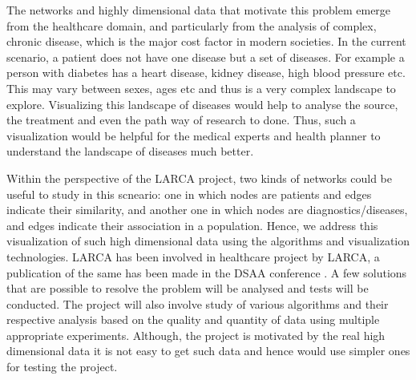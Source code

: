 \par The networks and highly dimensional data that motivate this problem emerge from the healthcare domain, and particularly from the analysis of complex, chronic disease, which is the major cost factor in modern societies. In the current scenario, a patient does not have one disease but a
set of diseases. For example a person with diabetes has a heart disease, kidney disease, high blood
pressure etc. This may vary between sexes, ages etc and thus is a very complex landscape to
explore. Visualizing this landscape of diseases would help to analyse the source, the treatment
and even the path way of research to done. Thus, such a visualization would be helpful for the
medical experts and health planner to understand the landscape of diseases much better.
\par Within the perspective of the LARCA project, two kinds of networks could be useful to study in this scneario: one in which nodes are patients and edges indicate their similarity, and another one in which nodes are diagnostics/diseases, and edges indicate their association in a population. Hence, we address this visualization of such high dimensional data using the algorithms and visualization technologies. LARCA has been involved in  healthcare project by LARCA, a publication of the same has been made in the DSAA conference \cite{sirlarca} . A few solutions that are possible to resolve the problem will be analysed and tests will be conducted. The project will also involve study of various algorithms and their respective analysis based on the quality and quantity of data using multiple appropriate experiments. Although, the project is motivated by the real high dimensional data it is not easy to get such data and hence would use simpler ones for testing the project.  



